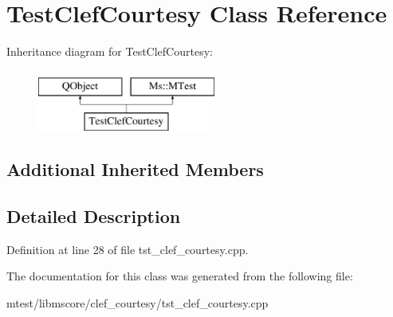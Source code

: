 \hypertarget{class_test_clef_courtesy}{}\section{Test\+Clef\+Courtesy Class Reference}
\label{class_test_clef_courtesy}
Inheritance diagram for Test\+Clef\+Courtesy\+:\begin{figure}[H]
\begin{center}
\leavevmode
\includegraphics[height=2.000000cm]{class_test_clef_courtesy}
\end{center}
\end{figure}
\subsection*{Additional Inherited Members}


\subsection{Detailed Description}


Definition at line 28 of file tst\+\_\+clef\+\_\+courtesy.\+cpp.



The documentation for this class was generated from the following file\+:\begin{DoxyCompactItemize}
\item 
mtest/libmscore/clef\+\_\+courtesy/tst\+\_\+clef\+\_\+courtesy.\+cpp\end{DoxyCompactItemize}

